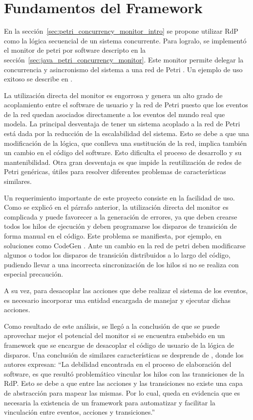 \section{Fundamentos del Framework}
En la sección~\ref{sec:petri_concurrency_monitor_intro} se propone utilizar RdP
como la lógica secuencial de un sistema concurrente. Para logralo, se
implementó el monitor de petri por software descripto en la
sección~\ref{sec:java_petri_concurrency_monitor}.
Este monitor permite delegar la concurrencia y asincronismo del
sistema a una red de Petri \cite{TesisMicolini}. Un ejemplo de uso exitoso se
describe en \cite{Bentivegna-Ludemann}.

La utilización directa del monitor es engorrosa y genera un
alto grado de acoplamiento entre el software de usuario y la red de Petri
puesto que los eventos de la red quedan asociados directamente a los eventos del
mundo real que modela.
La principal desventaja de tener un sistema acoplado a la red de Petri está dada por la
reducción de la escalabilidad del sistema. Esto se debe a que una modificación
de la lógica, que conlleva una sustitución de la red, implica también un cambio
en el código del software. Esto dificulta el proceso de desarrollo y su
mantenibilidad. Otra gran desventaja es que impide la reutilización de redes de
Petri genéricas, útiles para resolver diferentes problemas de
características similares.

Un requerimiento importante de este proyecto consiste en la facilidad de uso.
Como se explicó en el párrafo anterior, la utilización directa del monitor
es complicada y puede favorecer a la generación de errores, ya que deben
crearse todos los hilos de ejecución y deben programarse los disparos de
transición de forma manual en el código. Este problema se manifiesta, por
ejemplo, en soluciones como CodeGen \cite{codegen}.
Ante un cambio en la red de petri deben modificarse algunos o todos los
disparos de transición distribuidos a lo largo del código, pudiendo llevar a
una incorrecta sincronización de los hilos si no se realiza con especial
precaución.

A su vez, para desacoplar las acciones que debe realizar el sistema de los
eventos, es necesario incorporar una entidad encargada de manejar y ejecutar
dichas acciones.

Como resultado de este análisis, se llegó a la conclusión de que se puede
aprovechar mejor el potencial del monitor si se encuentra embebido en un
framework que se encargue de desacoplar el código de usuario de la lógica de
disparos. 
Una conclusión de similares características se desprende de
\cite{Bentivegna-Ludemann}, donde los autores expresan: ``La debilidad encontrada en el proceso de elaboración del
software, es que resultó problemático vincular los hilos con las transiciones de
la RdP. Esto se debe a que entre las acciones y las transiciones no existe
una capa de abstracción para mapear las mismas.
Por lo cual, queda en evidencia que es necesaria la existencia de un framework para automatizar y facilitar la
vinculación entre eventos, acciones y transiciones.''



